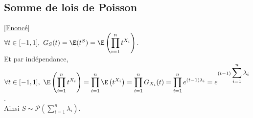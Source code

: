 \documentclass[8pt]{book}
\begin{document}
	\subsection{Somme de lois de Poisson }
	\label{Somme de lois de Poisson corrigé}
		\textcolor{blue}{\hyperref[Somme de lois de Poisson]{[Enoncé]}}\\
	$\forall t\in [-1,1],\ G_S(t)=\E(t^S)=\displaystyle\E\left(\prod_{i=1}^nt^{X_i}\right)$.\\
	Et par indépendance, $\forall t\in [-1,1],\ \displaystyle\E\left(\prod_{i=1}^nt^{X_i}\right)=\prod_{i=1}^n\E\left(t^{X_i}\right)=\prod_{i=1}^nG_{X_i}(t)=\prod_{i=1}^ne^{(t-1)\lambda_i}=e^{(t-1)\displaystyle\sum_{i=1}^n\lambda_i}$.\\
	Ainsi $S\sim \mathcal P\left(\displaystyle\sum_{i=1}^n\lambda_i\right)$.
	
\end{document}
